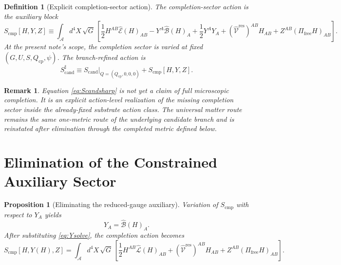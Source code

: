 \documentclass[11pt]{article}
\newcommand{\Sub}{\mathcal A}
\newcommand{\ResidualLift}{\widehat{\mathcal V}^{\mathrm{res}}}
\newcommand{\CompAction}{S_{\mathrm{cmp}}}
\newcommand{\CompletedAction}{S_{\mathrm{cand}}^{\sharp}}
\newcommand{\ChargeFields}{Q_{\mathrm{cp}}}
\newcommand{\SubEinLin}{\widehat{\mathcal E}}
\newcommand{\SubGaugeVec}{\widehat{\mathcal B}}
\newcommand{\SubReducedEin}{\widehat{\mathcal L}}
\newcommand{\FreeProj}{\Pi_{\mathrm{free}}}
\newcommand{\GaugeAux}{Y}
\newcommand{\ModeAux}{Z}
\newtheorem{definition}{Definition}
\newtheorem{proposition}{Proposition}
\newtheorem{remark}{Remark}
\begin{document}
\begin{definition}[Explicit completion-sector action]
\label{def:action}
The completion-sector action is the auxiliary block
\begin{equation}
\CompAction[H,\GaugeAux,\ModeAux]
\equiv
\int_{\Sub} d^4X\,\sqrt{G}\,
\left[
\frac12 H^{AB}\SubEinLin(H)_{AB}
-\GaugeAux^A\SubGaugeVec(H)_A
+\frac12 \GaugeAux^A\GaugeAux_A
+(\ResidualLift)^{AB}H_{AB}
+\ModeAux^{AB}(\FreeProj H)_{AB}
\right].
\label{eq:Scmp}
\end{equation}
At the present note's scope, the completion sector is varied at fixed \((G,U,S,\ChargeFields,\psi)\). The branch-refined action is
\begin{equation}
\CompletedAction
\equiv
S_{\mathrm{cand}}\big|_{Q=(\ChargeFields,0,0,0)}
+\CompAction[H,\GaugeAux,\ModeAux].
\label{eq:Scandsharp}
\end{equation}
\end{definition}

\begin{remark}
Equation \eqref{eq:Scandsharp} is not yet a claim of full microscopic completion. It is an explicit action-level realization of the missing completion sector inside the already-fixed substrate action class. The universal matter route remains the same one-metric route of the underlying candidate branch and is reinstated after elimination through the completed metric defined below.
\end{remark}

\section{Elimination of the Constrained Auxiliary Sector}

\begin{proposition}[Eliminating the reduced-gauge auxiliary]
\label{prop:Y}
Variation of \(\CompAction\) with respect to \(\GaugeAux_A\) yields
\begin{equation}
\GaugeAux_A=\SubGaugeVec(H)_A.
\label{eq:Ysolve}
\end{equation}
After substituting \eqref{eq:Ysolve}, the completion action becomes
\begin{equation}
\CompAction[H,\GaugeAux(H),\ModeAux]
=
\int_{\Sub} d^4X\,\sqrt{G}\,
\left[
\frac12 H^{AB}\SubReducedEin(H)_{AB}
+(\ResidualLift)^{AB}H_{AB}
+\ModeAux^{AB}(\FreeProj H)_{AB}
\right].
\label{eq:reducedaction}
\end{equation}
\end{proposition}
\end{document}
